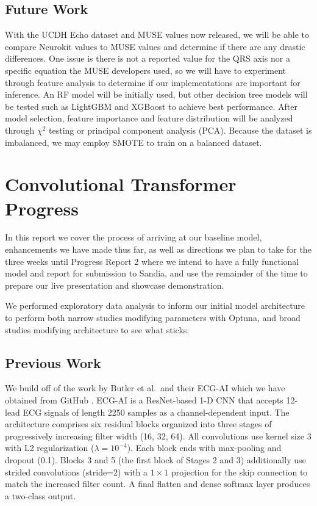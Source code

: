\documentclass[sigconf,nonacm]{acmart}
\begin{document}
\subsection{Future Work}

With the UCDH Echo dataset and MUSE values now released, we will be able to compare Neurokit values to MUSE values and determine if there are any drastic differences. One issue is there is not a reported value for the QRS axis nor a specific equation the MUSE developers used, so we will have to experiment through feature analysis to determine if our implementations are important for inference. An RF model will be initially used, but other decision tree models will be tested such as LightGBM and XGBoost to achieve best performance. After model selection, feature importance and feature distribution will be analyzed through $\chi^2$ testing or principal component analysis (PCA). Because the dataset is imbalanced, we may employ SMOTE to train on a balanced dataset.

\newpage
\section{Convolutional Transformer Progress}

In this report we cover the process of arriving at our baseline model, enhancements we have made thus far, as well as directions we plan to take for the three weeks until Progress Report 2 where we intend to have a fully functional model and report for submission to Sandia, and use the remainder of the time to prepare our live presentation and showcase demonstration.

We performed exploratory data analysis to inform our initial model architecture to perform both narrow studies modifying parameters with Optuna, and broad studies modifying architecture to see what sticks.

\subsection{Previous Work}

We build off of the work by Butler et al.\ and their ECG-AI which we have obtained from GitHub \cite{butler_ai-based_2024}. ECG-AI is a ResNet-based 1-D CNN that accepts 12-lead ECG signals of length 2250 samples as a channel-dependent input. The architecture comprises six residual blocks organized into three stages of progressively increasing filter width (16, 32, 64). All convolutions use kernel size 3 with L2 regularization ($\lambda = 10^{-4}$). Each block ends with max-pooling and dropout (0.1). Blocks 3 and 5 (the first block of Stages 2 and 3) additionally use strided convolutions (stride=2) with a $1\times1$ projection for the skip connection to match the increased filter count. A final flatten and dense softmax layer produces a two-class output.
\end{document}
